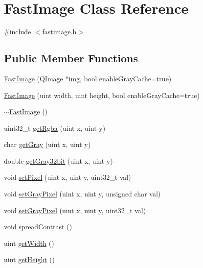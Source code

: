 \hypertarget{class_fast_image}{
\section{FastImage Class Reference}
\label{class_fast_image}
}


{\ttfamily \#include $<$fastimage.h$>$}

\subsection*{Public Member Functions}
\begin{DoxyCompactItemize}
\item 
\hyperlink{class_fast_image_a1ee91a3ac8ddcdfed90e9906bb3f0681}{FastImage} (QImage $\ast$img, bool enableGrayCache=true)
\item 
\hyperlink{class_fast_image_ab9530428f52635d4f87d9b1cc33e10cd}{FastImage} (uint width, uint height, bool enableGrayCache=true)
\item 
\hyperlink{class_fast_image_ae2937f18d549ffc788abaa1a5bf6f492}{$\sim$FastImage} ()
\item 
uint32\_\-t \hyperlink{class_fast_image_a09e6df8ae76ddffb813048157f887ee6}{getRgba} (uint x, uint y)
\item 
char \hyperlink{class_fast_image_a7da37f6c5c99feea80c6a699c7b51bd8}{getGray} (uint x, uint y)
\item 
double \hyperlink{class_fast_image_a6975ad540e89b98fda1b7a3bd3f812ea}{getGray32bit} (uint x, uint y)
\item 
void \hyperlink{class_fast_image_a647ac3b76f0198da77cd2e7afa46e1c4}{setPixel} (uint x, uint y, uint32\_\-t val)
\item 
void \hyperlink{class_fast_image_a1e0ef4ac5b61cc6d96c9cd9c4bada344}{setGrayPixel} (uint x, uint y, unsigned char val)
\item 
void \hyperlink{class_fast_image_a018ae53445320129fa129b80e805842c}{setGrayPixel} (uint x, uint y, uint32\_\-t val)
\item 
void \hyperlink{class_fast_image_adcf6d77e79c1f75f2420c6db0d96951d}{spreadContrast} ()
\item 
uint \hyperlink{class_fast_image_a94290d65ff847f0a7e56ac8050133313}{getWidth} ()
\item 
uint \hyperlink{class_fast_image_a1b90d63510575306ce345e393574d85c}{getHeight} ()
\end{DoxyCompactItemize}
